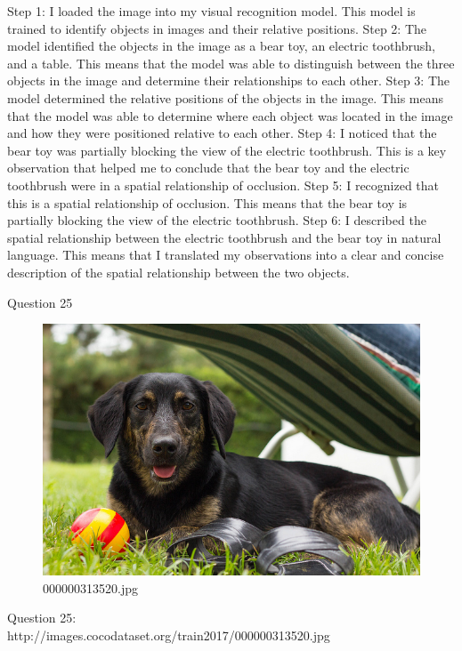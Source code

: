 \begin{enumerate}
        Step 1: I loaded the image into my visual recognition model. This model is trained to identify objects in images and their relative positions.
        Step 2: The model identified the objects in the image as a bear toy, an electric toothbrush, and a table. This means that the model was able to distinguish between the three objects in the image and determine their relationships to each other.
        Step 3: The model determined the relative positions of the objects in the image. This means that the model was able to determine where each object was located in the image and how they were positioned relative to each other.
        Step 4: I noticed that the bear toy was partially blocking the view of the electric toothbrush. This is a key observation that helped me to conclude that the bear toy and the electric toothbrush were in a spatial relationship of occlusion.
        Step 5: I recognized that this is a spatial relationship of occlusion. This means that the bear toy is partially blocking the view of the electric toothbrush.
        Step 6: I described the spatial relationship between the electric toothbrush and the bear toy in natural language. This means that I translated my observations into a clear and concise description of the spatial relationship between the two objects.
    \end{enumerate}
Question 25
    \begin{figure}[h]
        \centering
        \includegraphics[width=0.8\linewidth]{../image set/easy/000000313520.jpg}
        \caption{000000313520.jpg}
    \end{figure}
    Question 25:\\http://images.cocodataset.org/train2017/000000313520.jpg
